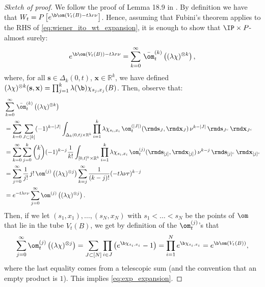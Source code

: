 \begin{proof}[Sketch of proof] We follow the proof of Lemma 18.9 in \cite{LastPenrose}. 
By definition we have that $W_t = P\left[e^{\b\om(V_t(B)-t\lambda r\nu}\right]$. Hence, assuming that Fubini's theorem applies to the RHS of \eqref{eq:wiener_ito_wt_expansion}, it is enough to show that $\IP\times P$-almost surely:
\begin{equation} \label{eq:exp_expansion}
e^{\b\om(V_t(B))-t\lambda r\nu} = \sum_{k=0}^\infty \, \bar{\om}^{(k)}_t \left((\lambda\chi)^{\otimes k}\right),
\end{equation}
where, for all $\mathbf{s}\in \Delta_k(0,t)$, $\mathbf{x}\in\mathbb{R}^k$, we have defined $(\lambda\chi)^{\otimes k}(\mathbf{s},\mathbf{x}) = \prod_{j=1}^k \lambda(\b)\chi_{s_j,x_j}(B)$.
Then, observe that:
\begin{align*}
&\sum_{k=0}^\infty \, \bar{\om}^{(k)}_t \left((\lambda\chi)^{\otimes k}\right)\\
& = \sum_{k=0}^\infty \sum_{J\subset [k]} (-1)^{k-|J|} \int_{\Delta_k(0,t)\times \mathbb{R}^k} \prod_{i=1}^k \lambda\chi_{s_i,x_i}\, \om_t^{(|J|)}(\rmd \mathbf{s}_J,\rmd \mathbf{x}_J) \, \nu^{k-|J|} \,\rmd \mathbf{s}_{J^c} \, \rmd \mathbf{x}_{J^c}\\
& = \sum_{k=0}^\infty \sum_{j=0}^k \binom{k}{j}(-1)^{k-j} \frac{1}{k!} \int_{[0,t]^k\times \mathbb{R}^k} \prod_{i=1}^k \lambda\chi_{s_i,x_i}\, \om_t^{(j)}(\rmd \mathbf{s}_{[j]},\rmd \mathbf{x}_{[j]}) \, \nu^{k-j} \,\rmd \mathbf{s}_{[j]^c} \, \rmd \mathbf{x}_{[j]^c}\\
& = \sum_{j=0}^\infty \frac{1}{j!}\, j!\, \om^{(j)} \left((\lambda\chi)^{\otimes j}\right) \sum_{k=j}^\infty \frac{1}{(k-j)!} (-t\lambda \nu r)^{k-j}\\
& = e^{-t\lambda r\nu} \sum_{j=0}^\infty \om^{(j)} \left((\lambda\chi)^{\otimes j}\right).
\end{align*}
Then, if we let $(s_1,x_1),\dots,(s_N,x_N)$ with $s_1<\dots<s_N$ be the points of $\om$ that lie in the tube $V_t(B)$, we get by definition of the $\om_t^{(j)}$'s that
\begin{equation*}
\sum_{j=0}^\infty \om_t^{(j)} \left((\lambda\chi)^{\otimes j}\right) = \sum_{J\subset [N]} \prod_{i\in J} \left(e^{\b \chi_{s_i,x_i}}-1 \right) = \prod_{i=1}^N e^{\b \chi_{s_i,x_i}} = e^{\b\om(V_t(B))},
\end{equation*}
where the last equality comes from a telescopic sum (and the convention that an empty product is $1$). This implies \eqref{eq:exp_expansion}. 


\end{proof}
